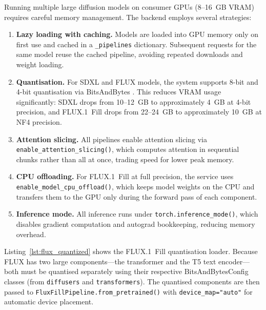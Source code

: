 \documentclass[12pt,a4paper]{report}
\begin{document}
Running multiple large diffusion models on consumer GPUs (8--16~GB VRAM) requires careful memory management. The backend employs several strategies:

\begin{enumerate}[leftmargin=*]
    \item \textbf{Lazy loading with caching.} Models are loaded into GPU memory only on first use and cached in a \texttt{\_pipelines} dictionary. Subsequent requests for the same model reuse the cached pipeline, avoiding repeated downloads and weight loading.

    \item \textbf{Quantisation.} For SDXL and FLUX models, the system supports 8-bit and 4-bit quantisation via BitsAndBytes \citep{Dettmers2022}. This reduces VRAM usage significantly: SDXL drops from 10--12~GB to approximately 4~GB at 4-bit precision, and FLUX.1~Fill drops from 22--24~GB to approximately 10~GB at NF4 precision.

    \item \textbf{Attention slicing.} All pipelines enable attention slicing via \texttt{enable\_\-attention\_\-slicing()}, which computes attention in sequential chunks rather than all at once, trading speed for lower peak memory.

    \item \textbf{CPU offloading.} For FLUX.1~Fill at full precision, the service uses \texttt{enable\_\-model\_\-cpu\_\-offload()}, which keeps model weights on the CPU and transfers them to the GPU only during the forward pass of each component.

    \item \textbf{Inference mode.} All inference runs under \texttt{torch.inference\_mode()}, which disables gradient computation and autograd bookkeeping, reducing memory overhead.
\end{enumerate}

Listing~\ref{lst:flux_quantized} shows the FLUX.1~Fill quantisation loader. Because FLUX has two large components---the transformer and the T5 text encoder---both must be quantised separately using their respective BitsAndBytesConfig classes (from \texttt{diffusers} and \texttt{transformers}). The quantised components are then passed to \texttt{FluxFillPipeline.from\_pretrained()} with \texttt{device\_map="auto"} for automatic device placement.
\end{document}
